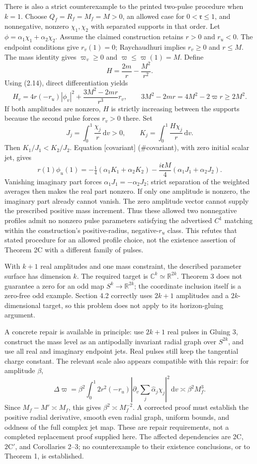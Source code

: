 \documentclass[10pt]{article}
\begin{document}
There is also a strict counterexample to the printed two-pulse procedure when \(k=1\). Choose \(Q_f=R_f=M_f=M>0\), an allowed case for \(0<\mathfrak r\leq1\), and nonnegative, nonzero \(\chi_1,\chi_2\) with separated supports in that order. Let \(\phi=\alpha_1\chi_1+\alpha_2\chi_2\). Assume the claimed construction retains \(r>0\) and \(r_u<0\). The endpoint conditions give \(r_v(1)=0\); Raychaudhuri implies \(r_v\geq0\) and \(r\leq M\). The mass identity gives \(\varpi_v\geq0\) and \(\varpi\leq\varpi(1)=M\). Define \[H=\frac{2m}{r}-\frac{M^2}{r^2}.\] Using (2.14), direct differentiation yields \[H_v=4r(-r_u)|\phi_v|^2+
       \frac{3M^2-2mr}{r^3}r_v,\qquad
 3M^2-2mr=4M^2-2\varpi r\geq2M^2.\] If both amplitudes are nonzero, \(H\) is strictly increasing between the supports because the second pulse forces \(r_v>0\) there. Set \[J_j=\int_0^1\frac{\chi_j}{r}\,\mathrm dv>0,\qquad
 K_j=\int_0^1\frac{H\chi_j}{r}\,\mathrm dv .\] Then \(K_1/J_1<K_2/J_2\). Equation [covariant] (\#covariant), with zero initial scalar jet, gives \[r(1)\phi_u(1)
   =-\tfrac14(\alpha_1K_1+\alpha_2K_2)
     -\frac{i\mathfrak eM}{4}(\alpha_1J_1+\alpha_2J_2).\] Vanishing imaginary part forces \(\alpha_1J_1=-\alpha_2J_2\); strict separation of the weighted averages then makes the real part nonzero. If only one amplitude is nonzero, the imaginary part already cannot vanish. The zero amplitude vector cannot supply the prescribed positive mass increment. Thus these allowed two nonnegative profiles admit no nonzero pulse parameters satisfying the advertised \(C^1\) matching within the construction’s positive-radius, negative-\(r_u\) class. This refutes that stated procedure for an allowed profile choice, not the existence assertion of Theorem 2C with a different family of pulses.\par
With \(k+1\) real amplitudes and one mass constraint, the described parameter surface has dimension \(k\). The required target is \(\mathbb C^k\simeq\mathbb R^{2k}\). Theorem 3 does not guarantee a zero for an odd map \(S^k\to\mathbb R^{2k}\); the coordinate inclusion itself is a zero-free odd example. Section 4.2 correctly uses \(2k+1\) amplitudes and a \(2k\)-dimensional target, so this problem does not apply to its horizon-gluing argument.\par
A concrete repair is available in principle: use \(2k+1\) real pulses in Gluing 3, construct the mass level as an antipodally invariant radial graph over \(S^{2k}\), and use all real and imaginary endpoint jets. Real pulses still keep the tangential charge constant. The relevant scale also appears compatible with this repair: for amplitude \(\beta\), \[\Delta\varpi
  =\beta^2\int_0^1 2r^2(-r_u)
       \left|\partial_v\sum_j\widehat\alpha_j\chi_j\right|^2\,\mathrm dv
  \asymp \beta^2 M_f^3.\] Since \(M_f-M'\asymp M_f\), this gives \(\beta^2\asymp M_f^{-2}\). A corrected proof must establish the positive radial derivative, smooth even radial graph, uniform bounds, and oddness of the full complex jet map. These are repair requirements, not a completed replacement proof supplied here. The affected dependencies are 2C, \(2\mathrm C'\), and Corollaries 2–3; no counterexample to their existence conclusions, or to Theorem 1, is established.\par
\end{document}
